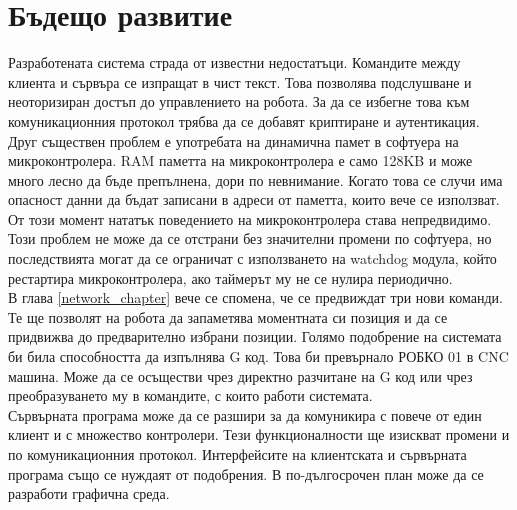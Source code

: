 \section{Бъдещо развитие}
Разработената система страда от известни недостатъци. Командите между клиента и сървъра се изпращат в чист текст. Това позволява подслушване и неоторизиран достъп до управлението на робота. За да се избегне това към комуникационния протокол трябва да се добавят криптиране и аутентикация.\\
\indent{}
Друг съществен проблем е употребата на динамична памет в софтуера на микроконтролера. RAM паметта на микроконтролера е само 128KB и може много лесно да бъде препълнена, дори по невнимание. Когато това се случи има опасност данни да бъдат записани в адреси от паметта, които вече се използват. От този момент нататък поведението на микроконтролера става непредвидимо. Този проблем не може да се отстрани без значителни промени по софтуера, но последствията могат да се ограничат с използването на watchdog модула, който рестартира микроконтролера, ако таймерът му не се нулира периодично.\\
\indent{}
В глава \ref{network_chapter} вече се спомена, че се предвиждат три нови команди. Те ще позволят на робота да запаметява моментната си позиция и да се придвижва до предварително избрани позиции. Голямо подобрение на системата би била способността да изпълнява G код. Това би превърнало РОБКО 01 в CNC машина. Може да се осъществи чрез директно разчитане на G код или чрез преобразуването му в командите, с които работи системата.\\
\indent{}
Сървърната програма може да се разшири за да комуникира с повече от един клиент и с множество контролери. Тези функционалности ще изискват промени и по комуникационния протокол. Интерфейсите на клиентската и сървърната програма също се нуждаят от подобрения. В по-дългосрочен план може да се разработи графична среда.